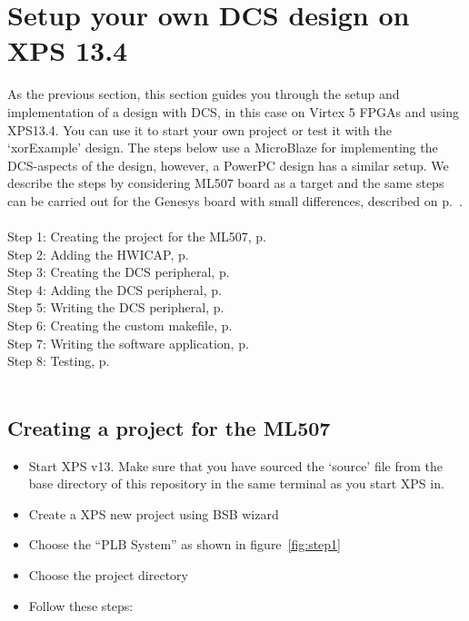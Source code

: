 \documentclass[a4paper,oneside]{memoir}
\begin{document}
\section{Setup your own DCS design on XPS 13.4}\label{sec:XPS13}
As the previous section, this section guides you through the setup and implementation of a design with DCS, in this case on Virtex 5 FPGAs and using XPS13.4. You can use it to start your own project or test it with the `xorExample' design. The steps below use a MicroBlaze for implementing the DCS-aspects of the design, however, a PowerPC design has a similar setup. We describe the steps by considering ML507 board as a target and the same steps can be carried out for the Genesys board with small differences, described on p.\ \pageref{sec:diff_genesys}.\\
\\   
Step 1: Creating the project for the ML507, p.\ \pageref{sec:creating_proj_blaze}\\
Step 2: Adding the HWICAP, p.\ \pageref{sec:adding_hwicap_blaze}\\
Step 3: Creating the DCS peripheral, p.\ \pageref{sec:creating_peripheral_blaze}\\
Step 4: Adding the DCS peripheral, p.\ \pageref{sec:adding_peripheral_blaze}\\
Step 5: Writing the DCS peripheral, p.\ \pageref{sec:writing_peripheral_blaze}\\
Step 6: Creating the custom makefile, p.\ \pageref{sec:creating_makefile_blaze}\\
Step 7: Writing the software application, p.\ \pageref{sec:writing_software_blaze}\\
Step 8: Testing, p.\ \pageref{sec:testing_blaze}\\
\\



\subsection{Creating a project for the ML507}\label{sec:creating_proj_blaze}

\begin{itemize}
\item Start XPS v13. Make sure that you have sourced the `source' file from the base directory of this repository in the same terminal as you start XPS in.
\item    Create a XPS new project using BSB wizard
\item    Choose the ``PLB System'' as shown in figure~\ref{fig:step1}
\item    Choose the project directory
\item    Follow these steps:
\end{itemize}
\end{document}
